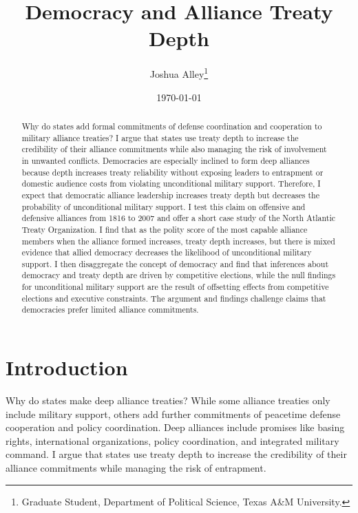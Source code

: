 \documentclass[12pt]{article}
\title{\textbf{Democracy and Alliance Treaty Depth}}
\author{Joshua Alley\footnote{Graduate Student,
Department of Political Science, Texas A\&M University.}}
\date{\today}
\begin{document}
\maketitle 

\doublespace 

\begin{abstract}
Why do states add formal commitments of defense coordination and cooperation to military alliance treaties? 
I argue that states use treaty depth to increase the credibility of their alliance commitments while also managing the risk of involvement in unwanted conflicts. 
Democracies are especially inclined to form deep alliances because depth increases treaty reliability without exposing leaders to entrapment or domestic audience costs from violating unconditional military support. 
Therefore, I expect that democratic alliance leadership increases treaty depth but decreases the probability of unconditional military support. 
I test this claim on offensive and defensive alliances from 1816 to 2007 and offer a short case study of the North Atlantic Treaty Organization.
I find that as the polity score of the most capable alliance members when the alliance formed increases, treaty depth increases, but there is mixed evidence that allied democracy decreases the likelihood of unconditional military support. 
I then disaggregate the concept of democracy and find that inferences about democracy and treaty depth are driven by competitive elections, while the null findings for unconditional military support are the result of offsetting effects from competitive elections and executive constraints.  
The argument and findings challenge claims that democracies prefer limited alliance commitments. 
\end{abstract}


\newpage 


\section{Introduction}


Why do states make deep alliance treaties? 
While some alliance treaties only include military support, others add further commitments of peacetime defense cooperation and policy coordination. 
Deep alliances include promises like basing rights, international organizations, policy coordination, and integrated military command.
I argue that states use treaty depth to increase the credibility of their alliance commitments while managing the risk of entrapment. 
\end{document}
